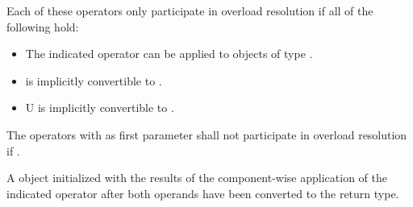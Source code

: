 \begin{itemdescr}
  \pnum\remarks Each of these operators only participate in overload resolution if all of the following hold:
  \begin{itemize}
    \item The indicated operator can be applied to objects of type \dataparreturntype{}\code{::}.
    \item \datapar{} is implicitly convertible to \dataparreturntype.
    \item \type U is implicitly convertible to \dataparreturntype.
  \end{itemize}

  \pnum\remarks The operators with  as first parameter shall not participate in overload resolution if .

  \pnum\returns A \datapar object initialized with the results of the component-wise application of the indicated operator after both operands have been converted to the return type.
\end{itemdescr}

